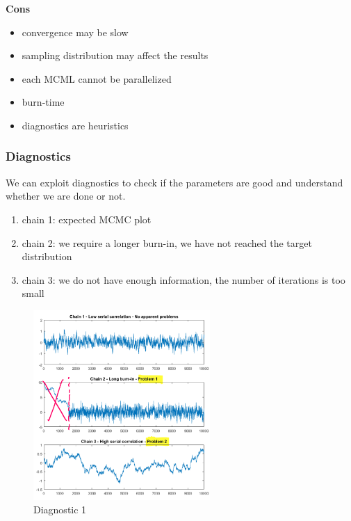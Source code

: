 \textbf{Cons}

\begin{itemize}
\tightlist
\item
  convergence may be slow
\item
  sampling distribution may affect the results
\item
  each MCML cannot be parallelized
\item
  burn-time
\item
  diagnostics are heuristics
\end{itemize}

\hypertarget{diagnostics}{%
\subsubsection{Diagnostics}\label{diagnostics}}

We can exploit diagnostics to check if the parameters are good and
understand whether we are done or not.

\begin{enumerate}
\def\labelenumi{\arabic{enumi}.}
\tightlist
\item
  chain 1: expected MCMC plot
\item
  chain 2: we require a longer burn-in, we have not reached the target
  distribution
\item
  chain 3: we do not have enough information, the number of iterations
  is too small
\end{enumerate}

\begin{figure}
\centering
\includegraphics[width=0.6\textwidth]{diag_1.png}
\caption{Diagnostic 1}
\end{figure}


